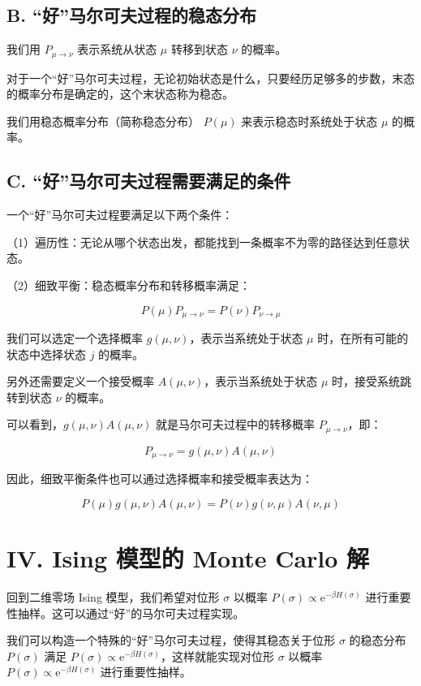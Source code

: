 \documentclass[aps,prl,twocolumn,groupedaddress]{revtex4-2}
\begin{document}
\subsection{B. “好”马尔可夫过程的稳态分布}

我们用 $P_{\mu\to \nu} $ 表示系统从状态 $\mu $ 转移到状态 $\nu $ 的概率。

对于一个“好”马尔可夫过程，无论初始状态是什么，只要经历足够多的步数，末态的概率分布是确定的，这个末状态称为稳态。

我们用稳态概率分布（简称稳态分布） $P(\mu) $ 来表示稳态时系统处于状态 $\mu $ 的概率。

\subsection{C. “好”马尔可夫过程需要满足的条件}

一个“好”马尔可夫过程要满足以下两个条件：

（1）遍历性：无论从哪个状态出发，都能找到一条概率不为零的路径达到任意状态。

（2）细致平衡：稳态概率分布和转移概率满足：

$$
P(\mu)P_{\mu\to \nu} = P(\nu) P_{\nu\to \mu}
$$

我们可以选定一个选择概率 $g(\mu,\nu) $，表示当系统处于状态 $\mu $ 时，在所有可能的状态中选择状态 $j $ 的概率。

另外还需要定义一个接受概率 $A(\mu,\nu) $，表示当系统处于状态 $\mu $ 时，接受系统跳转到状态 $\nu $ 的概率。

可以看到，$g(\mu,\nu)A(\mu,\nu) $ 就是马尔可夫过程中的转移概率 $P_{\mu\to \nu} $，即：

$$
P_{\mu\to \nu} = g(\mu,\nu)A(\mu,\nu)
$$

因此，细致平衡条件也可以通过选择概率和接受概率表达为：

$$
P(\mu)g(\mu,\nu)A(\mu,\nu) = P(\nu)g(\nu,\mu)A(\nu,\mu)
$$

\section{IV. Ising 模型的 Monte Carlo 解}

回到二维零场 Ising 模型，我们希望对位形 $\sigma $ 以概率 $P(\sigma)\propto \mathrm{e}^{-\beta H(\sigma)} $ 进行重要性抽样。这可以通过“好”的马尔可夫过程实现。

我们可以构造一个特殊的“好”马尔可夫过程，使得其稳态关于位形 $\sigma $ 的稳态分布 $P(\sigma) $ 满足 $P(\sigma)\propto \mathrm{e}^{-\beta H(\sigma)} $，这样就能实现对位形 $\sigma $ 以概率 $P(\sigma)\propto \mathrm{e}^{-\beta H(\sigma)} $ 进行重要性抽样。
\end{document}
